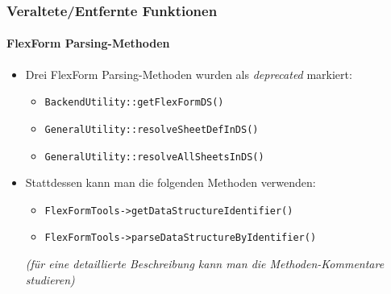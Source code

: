 \begin{frame}[fragile]
	\frametitle{Veraltete/Entfernte Funktionen}
	\framesubtitle{FlexForm Parsing-Methoden}

	\begin{itemize}
		\item Drei FlexForm Parsing-Methoden wurden als \textit{deprecated} markiert:

			\begin{itemize}
				\item \texttt{BackendUtility::getFlexFormDS()}
				\item \texttt{GeneralUtility::resolveSheetDefInDS()}
				\item \texttt{GeneralUtility::resolveAllSheetsInDS()}
			\end{itemize}

		\item Stattdessen kann man die folgenden Methoden verwenden:

			\begin{itemize}
				\item \texttt{FlexFormTools->getDataStructureIdentifier()}
				\item \texttt{FlexFormTools->parseDataStructureByIdentifier()}
			\end{itemize}

		\small
			\textit{(für eine detaillierte Beschreibung kann man die Methoden-Kommentare studieren)}
		\normalsize

	\end{itemize}

\end{frame}







